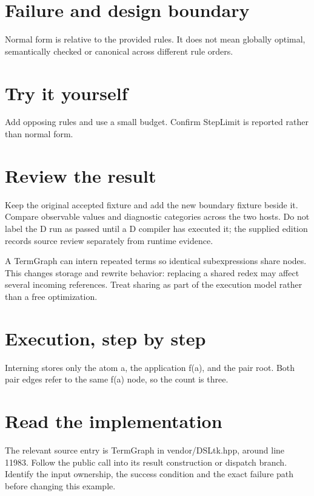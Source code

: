 
\section*{Failure and design boundary}
Normal form is relative to the provided rules. It does not mean globally optimal, semantically checked or canonical across different rule orders.

\section*{Try it yourself}
Add opposing rules and use a small budget. Confirm StepLimit is reported rather than normal form.

\section*{Review the result}
Keep the original accepted fixture and add the new boundary fixture beside it. Compare observable values and diagnostic categories across the two hosts. Do not label the D run as passed until a D compiler has executed it; the supplied edition records source review separately from runtime evidence.

\clearpage
{}
A TermGraph can intern repeated terms so identical subexpressions share nodes. This changes storage and rewrite behavior: replacing a shared redex may affect several incoming references. Treat sharing as part of the execution model rather than a free optimization.


\section*{Execution, step by step}
Interning stores only the atom a, the application f(a), and the pair root. Both pair edges refer to the same f(a) node, so the count is three.

\section*{Read the implementation}
The relevant source entry is TermGraph in vendor/DSLtk.hpp, around line 11983. Follow the public call into its result construction or dispatch branch. Identify the input ownership, the success condition and the exact failure path before changing this example.

